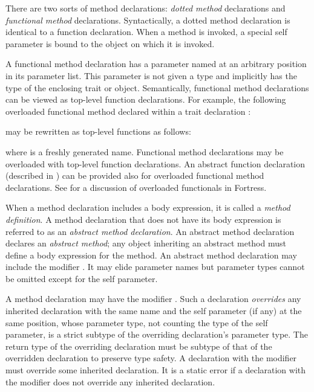 There are two sorts of method declarations:
\emph{dotted method} declarations and
\emph{functional method} declarations.
Syntactically, a dotted method declaration is identical to a function
declaration.
When a method is invoked, a special self parameter is bound to the
object on which it is invoked.



A functional method declaration has a parameter named  at an
arbitrary position in its parameter list.  This parameter is not given a type
and implicitly has the type of the enclosing trait or object.
Semantically, functional method declarations can be viewed as top-level
function declarations.  For example, the following overloaded functional method
 declared within a trait declaration :


may be rewritten as top-level functions as follows:


where  is a freshly generated name.
Functional method declarations may be overloaded with top-level function
declarations.
An abstract function declaration
(described in )
can be provided also for overloaded functional method declarations.
See  for a discussion of overloaded
functionals in Fortress.



When a method declaration includes a body expression, it is called a
\emph{method definition}.
A method declaration that does not have its body expression is referred to
as an \emph{abstract method declaration}.
An abstract method declaration declares an \emph{abstract method};
any object inheriting an abstract method must define a body expression for the
method.  An abstract method declaration may include the modifier .
It may elide parameter names but parameter
types cannot be omitted except for the self parameter.



A method declaration may have the modifier .
Such a declaration \emph{overrides} any inherited declaration with the same name
and the self parameter (if any) at the same position,
whose parameter type, not counting the type of the self parameter,
is a strict subtype of the overriding declaration's parameter type.
The return type of the overriding declaration must be subtype of
that of the overridden declaration to preserve type safety.
A declaration with the modifier  must override
some inherited declaration.
It is a static error if a declaration with the modifier 
does not override any inherited declaration.

